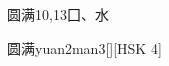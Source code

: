 \begin{entry}{圆满}{10,13}{⼞、⽔}
  \begin{phonetics}{圆满}{yuan2man3}[][HSK 4]
  \end{phonetics}
\end{entry}
